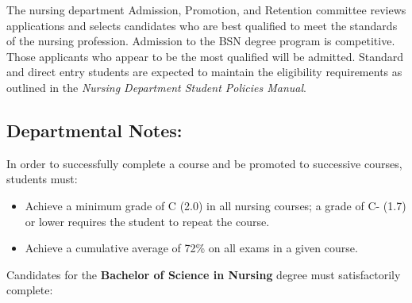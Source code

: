 \documentclass[
  letterpaper,
]{scrbook}
\providecommand{\tightlist}{%
  \setlength{\itemsep}{0pt}\setlength{\parskip}{0pt}}
\begin{document}
The nursing department Admission, Promotion, and Retention committee
reviews applications and selects candidates who are best qualified to
meet the standards of the nursing profession. Admission to the BSN
degree program is competitive. Those applicants who appear to be the
most qualified will be admitted. Standard and direct entry students are
expected to maintain the eligibility requirements as outlined in the
\emph{Nursing Department Student Policies Manual}.

\subsection{Departmental Notes:}\label{departmental-notes-1}

In order to successfully complete a course and be promoted to successive
courses, students must:

\begin{itemize}
\tightlist
\item
  Achieve a minimum grade of C (2.0) in all nursing courses; a grade of
  C- (1.7) or lower requires the student to repeat the course.
\item
  Achieve a cumulative average of 72\% on all exams in a given course.
\end{itemize}

Candidates for the \textbf{Bachelor of Science in Nursing} degree must
satisfactorily complete:
\end{document}
